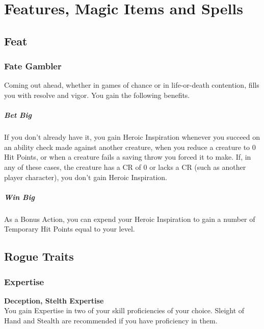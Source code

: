 \documentclass[letterpaper,openany,oneside,twocolumn]{book}
\begin{document}
\onecolumn


\rendercharactersheet

\renderbackgroundsheet

\renderspellsheet


\restoregeometry
\twocolumn

\chapter*{Features, Magic Items and Spells}
\section*{Feat}
\subsection*{Fate Gambler}
Coming out ahead, whether in games of chance or in life-or-death contention, fills you with resolve and vigor. You gain the following benefits.
\paragraph*{Bet Big} If you don't already have it, you gain Heroic Inspiration whenever you succeed on an ability check made against another creature, when you reduce a creature to 0 Hit Points, or when a creature fails a saving throw you forced it to make. If, in any of these cases, the creature has a CR of 0 or lacks a CR (such as another player character), you don't gain Heroic Inspiration.
\paragraph*{Win Big} As a Bonus Action, you can expend your Heroic Inspiration to gain a number of Temporary Hit Points equal to your level.

\section*{Rogue Traits}
\subsection*{Expertise}
\textbf{Deception, Stelth Expertise}\\
You gain Expertise in two of your skill proficiencies of your choice. Sleight of Hand and Stealth are recommended if you have proficiency in them.
\end{document}
